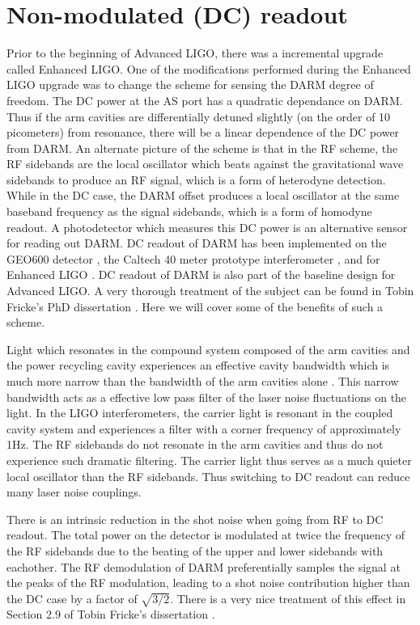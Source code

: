 \section{Non-modulated (DC) readout}
Prior to the beginning of Advanced LIGO, there was a incremental upgrade called Enhanced LIGO. %
One of the modifications performed during the Enhanced LIGO upgrade was to change the scheme for sensing the DARM degree of freedom. %
The DC power at the AS port has a quadratic dependance on DARM. %
Thus if the arm cavities are differentially detuned slightly (on the order of 10 picometers) from resonance, there will be a linear dependence of the DC power from DARM. %
An alternate picture of the scheme is that in the RF scheme, the RF sidebands are the local oscillator which beats against the gravitational wave sidebands to produce an RF signal, which is a form of heterodyne detection. %
While in the DC case, the DARM offset produces a local oscillator at the same baseband frequency as the signal sidebands, which is a form of homodyne readout. %
A photodetector which measures this DC power is an alternative sensor for reading out DARM. %
DC readout of DARM has been implemented on the GEO600 detector \cite{GEODC}, the Caltech 40 meter prototype interferometer \cite{40mDC}, and for Enhanced LIGO \cite{Tobin}. %
DC readout of DARM is also part of the baseline design for Advanced LIGO. %
A very thorough treatment of the subject can be found in Tobin Fricke's PhD dissertation \cite{FrickeThesis}. %
Here we will cover some of the benefits of such a scheme.

Light which resonates in the compound system composed of the arm cavities and the power recycling cavity experiences an effective cavity bandwidth which is much more narrow than the bandwidth of the arm cavities alone \cite{Rakhmanov}. %
This narrow bandwidth acts as a effective low pass filter of the laser noise fluctuations on the light. %
In the LIGO interferometers, the carrier light is resonant in the coupled cavity system and experiences a filter with a corner frequency of approximately 1Hz. %
The RF sidebands do not resonate in the arm cavities and thus do not experience such dramatic filtering. %
The carrier light thus serves as a much quieter local oscillator than the RF sidebands. %
Thus switching to DC readout can reduce many laser noise couplings.

There is an intrinsic reduction in the shot noise when going from RF to DC readout. %
The total power on the detector is modulated at twice the frequency of the RF sidebands due to the beating of the upper and lower sidebands with eachother. %
The RF demodulation of DARM preferentially samples the signal at the peaks of the RF modulation, leading to a shot noise contribution higher than the DC case by a factor of $\sqrt{3/2}$. %
There is a very nice treatment of this effect in Section 2.9 of Tobin Fricke's dissertation \cite{FrickeThesis}.

